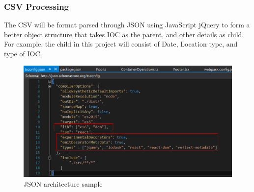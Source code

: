 \documentclass[journal,10pt,onecolumn,compsoc]{IEEEtran} \usepackage[margin=1.0in]{geometry} \usepackage{pdfpages}
\begin{document}
        \subsubsection{CSV Processing}
        The CSV will be format parsed through JSON using JavaScript jQuery to form a better object structure that takes IOC as the parent, and other details as child. For example, the child in this project will consist of Date, Location type, and type of IOC.
        \begin{figure}[H]
            \centering
            \includegraphics[width=\linewidth]{json.png}
            \caption{JSON architecture sample}
        \end{figure}
\end{document}
